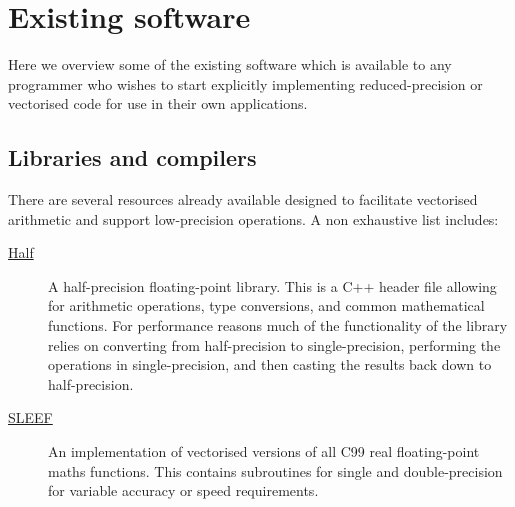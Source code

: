 \chapter{Existing software}
\label{chp:existing_software}

Here we overview some of the existing software which is available to any programmer who wishes to start explicitly implementing reduced-precision or vectorised code for use in their own applications. 

\section{Libraries and compilers}
\label{sec:libraries_and_compilers}

	There are several resources already available designed to facilitate vectorised arithmetic and support low-precision operations. A non exhaustive list includes:
	
	\begin{description}
		\item[\href{http://half.sourceforge.net/}{Half}] 
			A half-precision floating-point library. This is a C++ header file allowing for arithmetic operations, type conversions, and common mathematical functions. For performance reasons much of the functionality of the library relies on converting from half-precision to single-precision, performing the operations in single-precision, and then casting the results back down to half-precision.
			
		\item[\href{http://sleef.org/}{SLEEF}]
			An implementation of vectorised versions of all C99 real floating-point maths functions. This contains subroutines for single and double-precision for variable accuracy or speed requirements.
			
	\end{description}

\clearpage